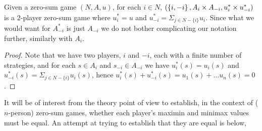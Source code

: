 	\begin{proposition} \label{prop:2pzsminmaxi=-minmaxj}
		Given a zero-sum game $(N, A, u)$, for each $i \in N$, $(\left\{i, -i\right\}, A_i\times{A_{-i}}, u^*_i\times u^*_{-i})$ is a $2$-player zero-sum game where $u^*_i = u$ and $u^*_{-i} = \Sigma_{j \in N-\{i\}}u_i$. Since what we would want for $A^*_{-i}$ is just $A_{-i}$ we do not bother complicating our notation further, similarly with $A_i$. 
		
		\begin{proof}
			Note that we have two players, $i$ and $-i$, each with a finite number of strategies, and for each $s \in A_i$ and $s_{-i} \in A_{-i}$ we have $u^*_i(s) = u_i(s)$ and $u^*_{-i}(s) = \Sigma_{j \in N-\{i\}} u_i(s)$, hence $u^*_i(s) + u^*_{-i}(s) = u_1(s) + \ldots u_n(s) = 0$.
		\end{proof}
	\end{proposition}
	
	It will be of interest from the theory point of view to establish, in the context of ($n$-person) zero-sum games, whether each player's maximin and minimax values must be equal. An attempt at trying to establish that they are equal is below, 
	
